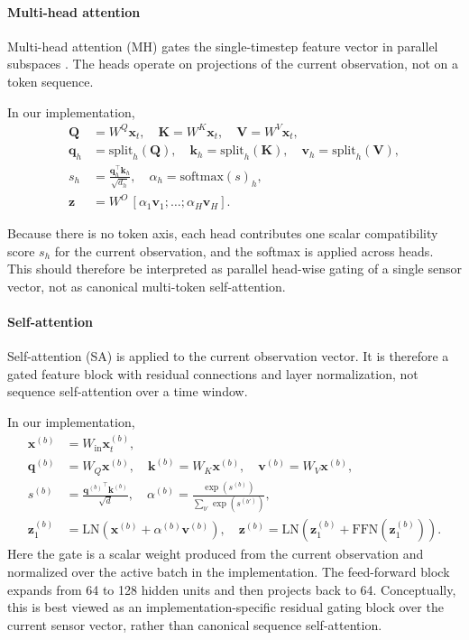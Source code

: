 \documentclass[sn-basic]{sn-jnl}%
\begin{document}
\paragraph{Multi-head attention}
Multi-head attention (MH) gates the single-timestep feature vector in parallel subspaces \cite{Vaswani2017}. The heads operate on projections of the current observation, not on a token sequence.

In our implementation,
\begin{align}
        \mathbf{Q}&=W^Q\mathbf{x}_t,\quad \mathbf{K}=W^K\mathbf{x}_t,\quad \mathbf{V}=W^V\mathbf{x}_t,\\
        \mathbf{q}_h&=\mathrm{split}_h(\mathbf{Q}),\quad \mathbf{k}_h=\mathrm{split}_h(\mathbf{K}),\quad \mathbf{v}_h=\mathrm{split}_h(\mathbf{V}),\\
        s_h&=\frac{\mathbf{q}_h^\top\mathbf{k}_h}{\sqrt{d_h}},\quad \alpha_h=\mathrm{softmax}(s)_h,\\
        \mathbf{z}&=W^O\,[\alpha_1\mathbf{v}_1;\ldots;\alpha_H\mathbf{v}_H].
\end{align}

Because there is no token axis, each head contributes one scalar compatibility score $s_h$ for the current observation, and the softmax is applied across heads. This should therefore be interpreted as parallel head-wise gating of a single sensor vector, not as canonical multi-token self-attention.

\paragraph{Self-attention}
Self-attention (SA) is applied to the current observation vector. It is therefore a gated feature block with residual connections and layer normalization, not sequence self-attention over a time window.

In our implementation,
\begin{align}
		\mathbf{x}^{(b)} &= W_{\mathrm{in}}\mathbf{x}_t^{(b)},\\
		\mathbf{q}^{(b)} &= W_Q\mathbf{x}^{(b)},\quad \mathbf{k}^{(b)}=W_K\mathbf{x}^{(b)},\quad \mathbf{v}^{(b)}=W_V\mathbf{x}^{(b)},\\
		s^{(b)} &= \frac{{\mathbf{q}^{(b)}}^\top\mathbf{k}^{(b)}}{\sqrt{d}},\quad
		\alpha^{(b)}=\frac{\exp(s^{(b)})}{\sum_{b'}\exp(s^{(b')})},\\
		\mathbf{z}_1^{(b)} &= \mathrm{LN}\!\left(\mathbf{x}^{(b)}+\alpha^{(b)}\mathbf{v}^{(b)}\right),\quad
		\mathbf{z}^{(b)}=\mathrm{LN}\!\left(\mathbf{z}_1^{(b)}+\mathrm{FFN}(\mathbf{z}_1^{(b)})\right).
\end{align}
Here the gate is a scalar weight produced from the current observation and normalized over the active batch in the implementation. The feed-forward block expands from 64 to 128 hidden units and then projects back to 64. Conceptually, this is best viewed as an implementation-specific residual gating block over the current sensor vector, rather than canonical sequence self-attention.
\end{document}
